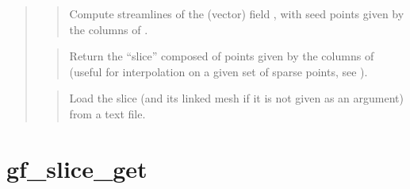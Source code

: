 \documentclass[a4paper,11pt,english]{sphinxmanual}
\begin{document}
\begin{quote}
\sphinxAtStartPar
{}
\begin{quote}

\sphinxAtStartPar
Compute streamlines of the (vector) field , with seed points given
by the columns of .
\end{quote}

\sphinxAtStartPar
{}
\begin{quote}

\sphinxAtStartPar
Return the “slice” composed of points given by the columns of 
(useful for interpolation on a given set of sparse points, see
).
\end{quote}

\sphinxAtStartPar
{}
\begin{quote}

\sphinxAtStartPar
Load the slice (and its linked mesh if it is not given as an argument)
from a text file.
\end{quote}
\end{quote}


\section{gf\_slice\_get}
\label{\detokenize{matlab_octave/cmdref_gf_slice_get:gf-slice-get}}\label{\detokenize{matlab_octave/cmdref_gf_slice_get::doc}}
\sphinxAtStartPar
{}
\end{document}
